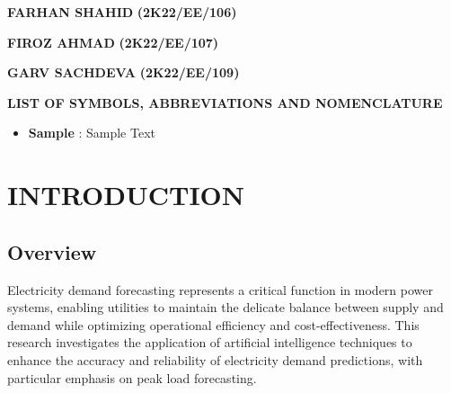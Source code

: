 \documentclass[12pt,a4paper]{report}
\begin{document}
\vspace{2 cm}                        
\begin{multicols}{3}
\centering
\textbf{FARHAN SHAHID}
\textbf{(2K22/EE/106)}\\
\vspace{0.3cm}


\textbf{FIROZ AHMAD}
\textbf{(2K22/EE/107)}\\
\vspace{0.3cm}


\textbf{GARV SACHDEVA}
\textbf{(2K22/EE/109)}\\
\vspace{0.3cm}
\end{multicols}

\tableofcontents %
\newpage
\listoftables


\newpage
\listoffigures
{}



\newpage
\begin{center}
  \textbf{LIST OF SYMBOLS, ABBREVIATIONS AND NOMENCLATURE} 
  \end{center}

\begin{itemize}
  \item[]\textbf{ Sample}  : Sample Text
\end{itemize}

\vspace{2cm}
\begin{center}
  \end{center}


\newpage

\chapter{INTRODUCTION}
\section{Overview}
Electricity demand forecasting represents a critical function in modern power systems, enabling utilities to maintain the delicate balance between supply and demand while optimizing operational efficiency and cost-effectiveness. This research investigates the application of artificial intelligence techniques to enhance the accuracy and reliability of electricity demand predictions, with particular emphasis on peak load forecasting.
\end{document}
